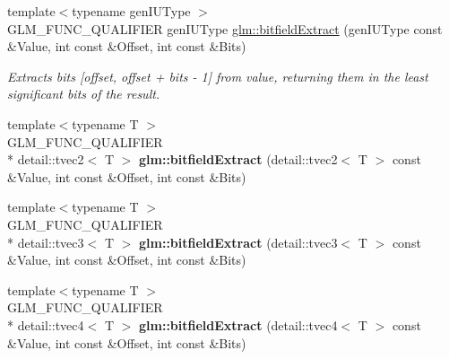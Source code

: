 \begin{DoxyCompactItemize}
\item 
{\footnotesize template$<$typename gen\-I\-U\-Type $>$ }\\G\-L\-M\-\_\-\-F\-U\-N\-C\-\_\-\-Q\-U\-A\-L\-I\-F\-I\-E\-R gen\-I\-U\-Type \hyperlink{group__core__func__integer_gaeae27fd61779ae93b8d0fa9cef142c3d}{glm\-::bitfield\-Extract} (gen\-I\-U\-Type const \&Value, int const \&Offset, int const \&Bits)
\begin{DoxyCompactList}\small\item\em Extracts bits \mbox{[}offset, offset + bits -\/ 1\mbox{]} from value, returning them in the least significant bits of the result. \end{DoxyCompactList}\item 
\hypertarget{namespaceglm_a62e1ddc745fb24a1aab7a76a2ffd3a33}{{\footnotesize template$<$typename T $>$ }\\G\-L\-M\-\_\-\-F\-U\-N\-C\-\_\-\-Q\-U\-A\-L\-I\-F\-I\-E\-R \\*
detail\-::tvec2$<$ T $>$ {\bfseries glm\-::bitfield\-Extract} (detail\-::tvec2$<$ T $>$ const \&Value, int const \&Offset, int const \&Bits)}\label{namespaceglm_a62e1ddc745fb24a1aab7a76a2ffd3a33}

\item 
\hypertarget{namespaceglm_ab98cc1758f2f503a01d7e501130cd65f}{{\footnotesize template$<$typename T $>$ }\\G\-L\-M\-\_\-\-F\-U\-N\-C\-\_\-\-Q\-U\-A\-L\-I\-F\-I\-E\-R \\*
detail\-::tvec3$<$ T $>$ {\bfseries glm\-::bitfield\-Extract} (detail\-::tvec3$<$ T $>$ const \&Value, int const \&Offset, int const \&Bits)}\label{namespaceglm_ab98cc1758f2f503a01d7e501130cd65f}

\item 
\hypertarget{namespaceglm_a63dec2549abeb2193447b216e8f06158}{{\footnotesize template$<$typename T $>$ }\\G\-L\-M\-\_\-\-F\-U\-N\-C\-\_\-\-Q\-U\-A\-L\-I\-F\-I\-E\-R \\*
detail\-::tvec4$<$ T $>$ {\bfseries glm\-::bitfield\-Extract} (detail\-::tvec4$<$ T $>$ const \&Value, int const \&Offset, int const \&Bits)}\label{namespaceglm_a63dec2549abeb2193447b216e8f06158}


\end{DoxyCompactItemize}
